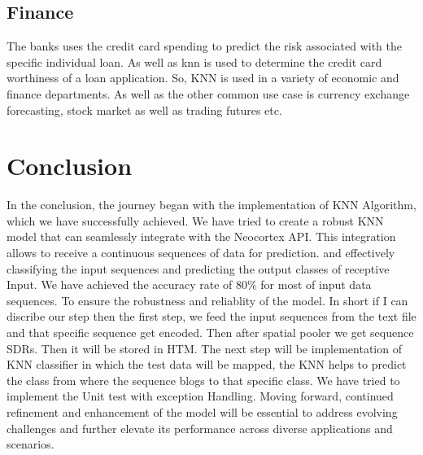 \documentclass[conference]{IEEEtran}
\begin{document}
\subsection{Finance}
The banks uses the credit card spending to predict the risk associated with the specific individual loan. As well as knn is used to determine the credit card worthiness of a loan application. So, KNN is used in a variety of economic and finance departments. As well as the other common use case is currency exchange forecasting, stock market as well as trading futures etc.  



\section{Conclusion}
In the conclusion, the journey began with the implementation of KNN Algorithm, which we have successfully achieved. We have tried to create a robust KNN model that can seamlessly integrate with the Neocortex API. This integration allows to receive a continuous sequences of data for prediction. and effectively classifying the input sequences and predicting the output classes of receptive Input. We have achieved the accuracy rate of 80\% for most of input data sequences. To ensure the robustness and reliablity of the model. In short if I can discribe our step then the first step, we feed the input sequences from the text file and that specific sequence get encoded. Then after spatial pooler we get sequence SDRs. Then it will be stored in HTM. The next step will be implementation of KNN classifier in which the test data will be mapped, the KNN helps to predict the class from where the sequence blogs to that specific class. We have tried to implement the Unit test with exception Handling. Moving forward, continued refinement and enhancement of the model will be essential to address evolving challenges and further elevate its performance across diverse applications and scenarios.
\end{document}
